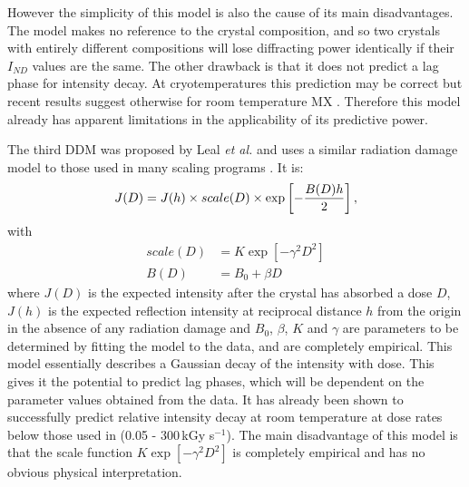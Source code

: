 However the simplicity of this model is also the cause of its main disadvantages.
The model makes no reference to the crystal composition, and so two crystals with entirely different compositions will lose diffracting power identically if their $I_{ND}$ values are the same.
The other drawback is that it does not predict a lag phase for intensity decay.
At cryotemperatures this prediction may be correct but recent results suggest otherwise for room temperature MX \cite{owen2014}.
Therefore this model already has apparent limitations in the applicability of its predictive power.

The third DDM was proposed by Leal \emph{et al.} \cite{leal2012} and uses a similar radiation damage model to those used in many scaling programs \cite{evans2013,kabsch2010}. It is:
\begin{equation}
J(D) = J(h) \times scale(D) \times \exp\left[-\frac{B(D) h}{2}\right],
\label{eq:Leal DDM}
\end{equation}
with
\begin{align}
scale(D) &= K\exp\left[-\gamma^2 D^2 \right] \label{eqscale}\\
B(D)     &= B_0 + \beta D \label{eqB}
\end{align}
where $J(D)$ is the expected intensity after the crystal has absorbed a dose $D$, $J(h)$ is the expected reflection intensity at reciprocal distance $h$ from the origin in the absence of any radiation damage and $B_0$, $\beta$, $K$ and $\gamma$ are parameters to be determined by fitting the model to the data, and are completely empirical.
\newline
This model essentially describes a Gaussian decay of the intensity with dose.
This gives it the potential to predict lag phases, which will be dependent on the parameter values obtained from the data.
It has already been shown to successfully predict relative intensity decay at room temperature \cite{leal2012} at dose rates below those used in \cite{owen2014} (0.05 - 300$\,$kGy s$^{-1}$).
The main disadvantage of this model is that the scale function $K \exp\left[-\gamma^2 D^2 \right]$ is completely empirical and has no obvious physical interpretation.

